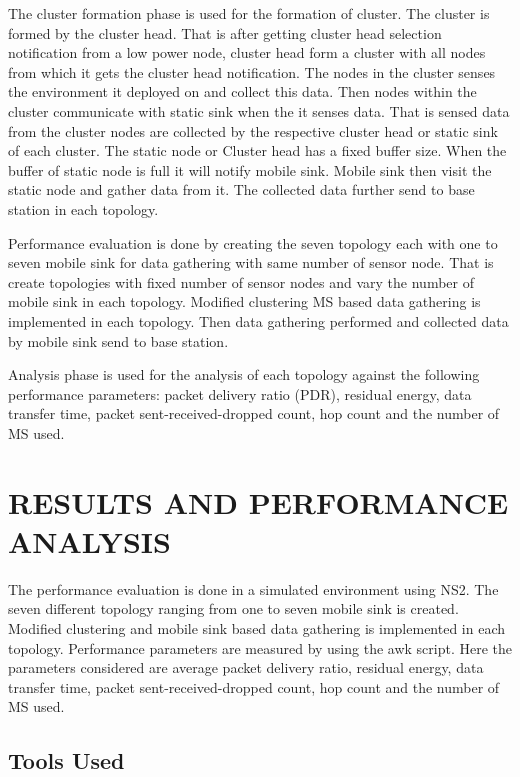 \documentclass[MTech]{iitmdiss}
\begin{document}
 
  The cluster formation phase is used for the formation of cluster. The cluster is formed by the cluster head. That is after getting cluster head selection notification from a low power node, cluster head form a cluster  with all nodes from which it gets the cluster head notification. The nodes in the cluster senses the environment it deployed on and collect this data. Then nodes within the cluster communicate with static sink when the it senses data. That is sensed data from the cluster nodes are collected by the respective cluster head or static sink of each cluster. The static node or Cluster head has a fixed buffer size. When the buffer of static node is full it will notify mobile sink. Mobile sink then visit the static node and gather data from it. The collected data further send to base station in each topology.


Performance evaluation is done by creating the seven topology each with one to seven mobile sink for data gathering with same number of sensor node. That is create topologies with fixed number of sensor nodes and vary the number of mobile sink in each topology. Modified clustering MS based data gathering is implemented in each topology. Then data gathering  performed and collected data by mobile sink send to base station.


 Analysis phase is used for the analysis of each topology against the following performance parameters: packet delivery ratio (PDR), residual energy, data transfer time, packet sent-received-dropped count, hop count and the number of MS used.


\pagebreak
\chapter{RESULTS AND PERFORMANCE ANALYSIS}
\label{chap:fut}
The performance evaluation is done in a simulated environment using NS2. The seven different  topology ranging from one to seven mobile sink is created.  Modified clustering and mobile sink based data gathering is implemented in each topology. Performance parameters are measured by using the awk script. Here the parameters considered are average packet delivery ratio, residual energy, data transfer time, packet sent-received-dropped count, hop count and the number of MS used.

\section{Tools Used}
\end{document}
